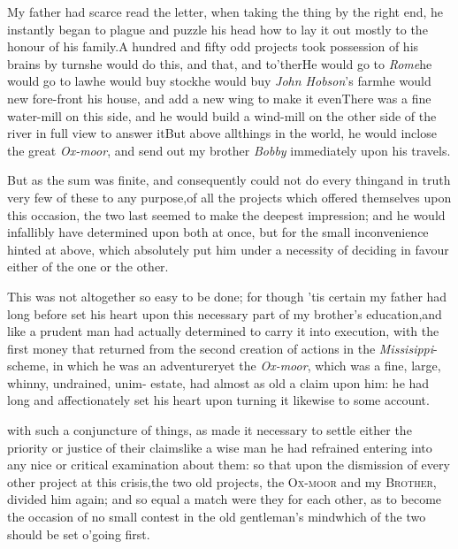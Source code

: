 \documentclass{article}
\begin{document}
My father had scarce read the letter, when taking the thing by
the right end, he instantly began to plague and puzzle his head how
to lay it out mostly to the honour of his family.\tsk A
hundred and fifty odd projects took possession of his brains by
turns\tsk he would do this, and that, and to’ther\tsk He
would go to \textit{Rome}\tsh he would go to
law\tsh he would buy stock\tsh he would buy
\textit{John Hobson}’s farm\tsk he would new fore-front his
house, and add a new wing to make it even\tsk There was a
fine water-mill on this side, and he would build a wind-mill on the
other side of the river in full view to answer it\tsk But above
all\pb things in the world, he would inclose the great \textit{Ox-moor}, 
and send out my brother \textit{Bobby} immediately upon his
travels.

But as the sum was finite, and consequently could not do
every thing\tsk and in truth very few of these to any
purpose,\tsk of all the projects which offered themselves
upon this occasion, the two last seemed to make the deepest
impression; and he would infallibly have determined upon
both at once, but for the small inconvenience hinted at
above, which absolutely put him under a necessity of
deciding in favour either of the one or the other.

This was not altogether so easy to be done; for though
’tis certain my father had long before set his heart upon
this necessary part of my brother’s education,\pb and like a
prudent man had actually determined to carry it into execution,
with the first money that returned from the second creation of
actions in the \textit{Missisippi}-scheme, in which he was an
adventurer\tsh yet the \textit{Ox-moor}, which was a fine,
large, whinny, undrained, unim-\break
{}\break
estate, had almost as old a claim upon him: he had
long and affectionately set his heart upon turning it likewise to
some account.

 with such a conjuncture
of things, as made it necessary to settle either the priority or justice of their claims\tsh like a
wise man he had refrained entering into any nice or critical
examination about them: so that upon the dismission of every other
project at this crisis,\tsh\pb the two old projects, the
O\textsc{x-moor} and my \textsc{Brother}, divided him
again; and so equal a match were they for each other, as to become
the occasion of no small contest in the old gentleman’s
mind\tsk which of the two should be set o’going first.
\end{document}
